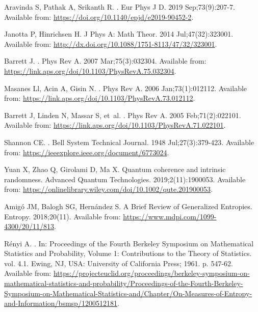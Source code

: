 \documentclass[]{interact}
\theoremstyle{plain}%
\theoremstyle{definition}
\theoremstyle{remark}
\begin{document}
\begin{thebibliography}{100}
Aravinda S, Pathak A, Srikanth R.
.
\newblock Eur Phys J D. 2019 Sep;73(9):207-7.
\newblock Available from: \url{https://doi.org/10.1140/epjd/e2019-90452-2}.

Janotta P, Hinrichsen H.
\newblock J Phys A: Math Theor. 2014 Jul;47(32):323001.
\newblock Available from:
  \url{http://dx.doi.org/10.1088/1751-8113/47/32/323001}.

Barrett J.
.
\newblock Phys Rev A. 2007 Mar;75(3):032304.
\newblock Available from:
  \url{https://link.aps.org/doi/10.1103/PhysRevA.75.032304}.

Masanes {\relax Ll}, Acin A, Gisin N.
.
\newblock Phys Rev A. 2006 Jan;73(1):012112.
\newblock Available from:
  \url{https://link.aps.org/doi/10.1103/PhysRevA.73.012112}.

Barrett J, Linden N, Massar S, et~al.
.
\newblock Phys Rev A. 2005 Feb;71(2):022101.
\newblock Available from:
  \url{https://link.aps.org/doi/10.1103/PhysRevA.71.022101}.

Shannon CE.
.
\newblock Bell System Technical Journal. 1948 Jul;27(3):379-423.
\newblock Available from: \url{https://ieeexplore.ieee.org/document/6773024}.

Yuan X, Zhao Q, Girolami D, Ma X.
\newblock Quantum coherence and intrinsic randomness.
\newblock Advanced Quantum Technologies. 2019;2(11):1900053.
\newblock Available from:
  \url{https://onlinelibrary.wiley.com/doi/10.1002/qute.201900053}.

Amigó JM, Balogh SG, Hernández S.
\newblock A Brief Review of Generalized Entropies.
\newblock Entropy. 2018;20(11).
\newblock Available from: \url{https://www.mdpi.com/1099-4300/20/11/813}.

R{\ifmmode{}\else\'{e}\fi}nyi A.
.
\newblock In: {Proceedings of the Fourth Berkeley Symposium on Mathematical
  Statistics and Probability, Volume 1: Contributions to the Theory of
  Statistics}. vol. 4.1. Ewing, NJ, USA: University of California Press; 1961.
  p. 547-62.
\newblock Available from:
  \url{https://projecteuclid.org/proceedings/berkeley-symposium-on-mathematical-statistics-and-probability/Proceedings-of-the-Fourth-Berkeley-Symposium-on-Mathematical-Statistics-and/Chapter/On-Measures-of-Entropy-and-Information/bsmsp/1200512181}.


\end{thebibliography}
\end{document}
